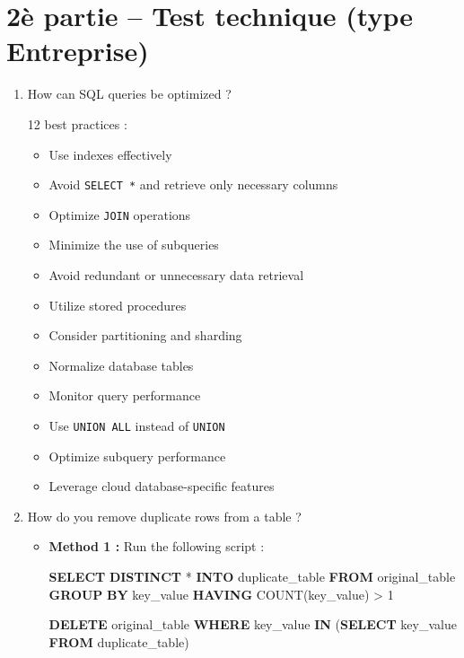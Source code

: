 \documentclass[12pt, french]{article}
\providecommand{\tightlist}{%
      \setlength{\itemsep}{0pt}\setlength{\parskip}{0pt}}
\newenvironment{Shaded}{}{}
\newcommand{\KeywordTok}[1]{\textcolor[rgb]{0.00,0.44,0.13}{\textbf{{#1}}}}
\newcommand{\DecValTok}[1]{\textcolor[rgb]{0.25,0.63,0.44}{{#1}}}
\newcommand{\FunctionTok}[1]{\textcolor[rgb]{0.02,0.16,0.49}{{#1}}}
\newcommand{\NormalTok}[1]{{#1}}
\newcommand{\OperatorTok}[1]{\textcolor[rgb]{0.40,0.40,0.40}{{#1}}}
\begin{document}
\section{2è partie -- Test technique (type
Entreprise)}\label{uxe8-partie-test-technique-type-entreprise}

\begin{enumerate}
\def\labelenumi{\arabic{enumi}.}
\item
  How can SQL queries be optimized ?

  12 best practices :

  \begin{itemize}
  \tightlist
  \item
    Use indexes effectively
  \item
    Avoid \texttt{SELECT\ *} and retrieve only necessary columns
  \item
    Optimize \texttt{JOIN} operations
  \item
    Minimize the use of subqueries
  \item
    Avoid redundant or unnecessary data retrieval
  \item
    Utilize stored procedures
  \item
    Consider partitioning and sharding
  \item
    Normalize database tables
  \item
    Monitor query performance
  \item
    Use \texttt{UNION\ ALL} instead of \texttt{UNION}
  \item
    Optimize subquery performance
  \item
    Leverage cloud database-specific features
  \end{itemize}
\item
  How do you remove duplicate rows from a table ?

  \begin{itemize}
  \item
    \textbf{Method 1 :} Run the following script :

\begin{Shaded}
\begin{Highlighting}[]
\KeywordTok{SELECT} \KeywordTok{DISTINCT} \OperatorTok{*}
\KeywordTok{INTO}\NormalTok{ duplicate\_table}
\KeywordTok{FROM}\NormalTok{ original\_table}
\KeywordTok{GROUP} \KeywordTok{BY}\NormalTok{ key\_value}
\KeywordTok{HAVING} \FunctionTok{COUNT}\NormalTok{(key\_value) }\OperatorTok{\textgreater{}} \DecValTok{1}

\KeywordTok{DELETE}\NormalTok{ original\_table}
\KeywordTok{WHERE}\NormalTok{ key\_value}
\KeywordTok{IN}\NormalTok{ (}\KeywordTok{SELECT}\NormalTok{ key\_value}
\KeywordTok{FROM}\NormalTok{ duplicate\_table)}


\end{Highlighting}
\end{Shaded}
\end{itemize}
\end{enumerate}
\end{document}
